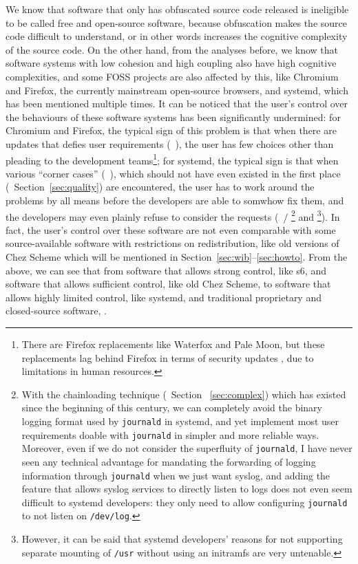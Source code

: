 We know that software that only has obfuscated source code released is
ineligible to be called free and open-source software, because obfuscation
makes the source code difficult to understand, or in other words increases the
cognitive complexity of the source code.  On the other hand, from the analyses
before, we know that software systems with low cohesion and high coupling also
have high cognitive complexities, and some FOSS projects are also affected by
this, like Chromium and Firefox, the currently mainstream open-source browsers,
and systemd, which has been mentioned multiple times.  It can be noticed
that the user's control over the behaviours of these software systems has
been significantly undermined: for Chromium and Firefox, the typical sign
of this problem is that when there are updates that defies user requirements
(\eg~\parencite{beauhd2019, namelessvoice2018}), the user has few choices
other than pleading to the development teams\footnote{There are Firefox
replacements like Waterfox and Pale Moon, but these replacements lag behind
Firefox in terms of security updates \etc, due to limitations in human
resources.}; for systemd, the typical sign is that
when various ``corner cases'' (\eg~\parencite{ratagupt2017}), which should
not have even existed in the first place (\cf~Section~\ref{sec:quality})
are encountered, the user has to work around the problems by all means before
the developers are able to somwhow fix them, and the developers may even
plainly refuse to consider the requests (\eg~\parencite{akcaagac2013}/%
\parencite{junta2017}\footnote{With the chainloading technique (\cf~Section~%
\ref{sec:complex}) which has existed since the beginning of this century, we
can completely avoid the binary logging format used by \texttt{journald} in
systemd, and yet implement most user requirements doable with \texttt{journald}
in simpler and more reliable ways.  Moreover, even if we do not consider the
superfluity of \texttt{journald}, I have never seen any technical advantage
for mandating the forwarding of logging information through \texttt{journald}
when we just want syslog, and adding the feature that allows syslog
services to directly listen to logs does not even seem difficult to systemd
developers: they only need to allow configuring \texttt{journald} to not
listen on \texttt{/dev/log}.} and \parencite{freedesktop:sepusr}\footnote%
{However, it can be said that systemd developers' reasons for not supporting
separate mounting of \texttt{/usr} without using an initramfs are very
untenable.}).  In fact, the user's control over
these software are not even comparable with some source-available software
with restrictions on redistribution, like old versions of Chez Scheme which
will be mentioned in Section~\ref{sec:wib}--\ref{sec:howto}.  From the
above, we can see that from software that allows strong control, like s6, and
software that allows sufficient control, like old Chez Scheme, to software that
allows highly limited control, like systemd, and traditional proprietary and
closed-source software, .

